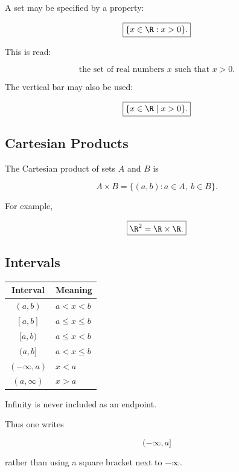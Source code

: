 A set may be specified by a property:

\[
\boxed{
\{x\in\R:x>0\}.
}
\]

This is read:

\[
\boxed{
\text{the set of real numbers }x\text{ such that }x>0.
}
\]

The vertical bar may also be used:

\[
\boxed{
\{x\in\R\mid x>0\}.
}
\]

\subsection{Cartesian Products}
\label{subsec:cartesian-product-notation}

The Cartesian product of sets \(A\) and \(B\) is

\[
\boxed{
A\times B
=
\{
(a,b):a\in A,\ b\in B
\}.
}
\]

For example,

\[
\boxed{
\R^2
=
\R\times\R.
}
\]

\subsection{Intervals}
\label{subsec:interval-notation-reference}

\begin{center}
\begin{tabular}{c|l}
\textbf{Interval} & \textbf{Meaning} \\ \hline
\( (a,b) \) & \(a<x<b\) \\
\( [a,b] \) & \(a\leq x\leq b\) \\
\( [a,b) \) & \(a\leq x<b\) \\
\( (a,b] \) & \(a<x\leq b\) \\
\( (-\infty,a) \) & \(x<a\) \\
\( (a,\infty) \) & \(x>a\)
\end{tabular}
\end{center}

Infinity is never included as an endpoint.

Thus one writes

\[
\boxed{
(-\infty,a]
}
\]

rather than using a square bracket next to \(-\infty\).


